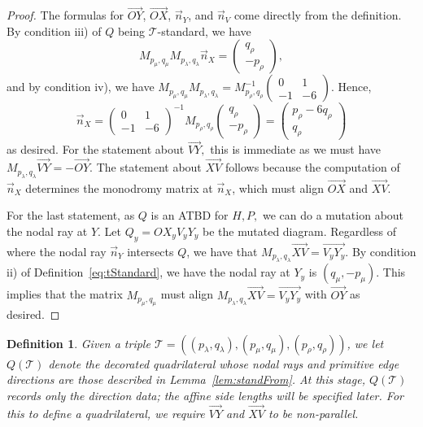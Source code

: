 \documentclass[11pt, reqno]{amsart}
\newtheorem{definition}[thm]{Definition}
\theoremstyle{remark}
\numberwithin{equation}{subsection}
\numberwithin{figure}{section}
\theoremstyle{customremark}
\newcommand{\Tt}{\mathcal{T}}
\newcommand{\vn}{{\vec{n}}}
\newcommand{\ovr}{\overrightarrow}
\newcommand{\la}{{\lambda}}
\begin{document}
\begin{proof}
    The formulas for $\ovr{OY}$, $\ovr{OX}$, $\vn_Y$, and $\vn_V$ come directly from the definition. By condition iii) of $Q$ being $\Tt$-standard, we have
    \[ M_{p_\mu,q_\mu}M_{p_\la,q_\la}\vn_X=\begin{pmatrix} q_\rho \\ -p_\rho\end{pmatrix},\]
    and by condition iv), we have $M_{p_\mu,q_\mu}M_{p_\la,q_\la}=M_{p_\rho,q_\rho}^{-1} \begin{pmatrix} 0 & 1 \\ -1 & -6 \end{pmatrix}.$
    Hence, 
    \[ \vn_X=\begin{pmatrix} 0 & 1 \\ -1 & -6 \end{pmatrix}^{-1}M_{p_\rho,q_\rho}\begin{pmatrix} q_\rho \\ -p_\rho\end{pmatrix}=\begin{pmatrix} p_\rho-6q_\rho \\ q_\rho \end{pmatrix} \]
    as desired. 
    For the statement about $\ovr{VY},$ this is immediate as we must have $M_{p_\la,q_\la}\ovr{VY}=-\ovr{OY}.$ The statement about $\ovr{XV}$ follows because the computation of $\vn_X$ determines the monodromy matrix at $\vn_X$, which must align $\ovr{OX}$ and $\ovr{XV}$.
    
    For the last statement, as $Q$ is an ATBD for $H,P,$ we can do a mutation about the nodal ray at $Y.$ Let $Q_y=OX_yV_yY_y$ be the mutated diagram. Regardless of where the nodal ray $\vn_Y$ intersects $Q$, we have that $M_{p_\la,q_\la}\ovr{XV}=\ovr{V_yY_y}.$ By condition ii) of Definition~\ref{eq:tStandard}, we have the nodal ray at $Y_y$ is $(q_\mu,-p_\mu).$ This implies that the matrix $M_{p_\mu,q_\mu}$ must align $M_{p_\la,q_\la}\ovr{XV}=\ovr{V_yY_y}$ with $\ovr{OY}$ as desired. 
  
\end{proof}

\begin{definition} \label{def:QTnoL}
Given a triple $\Tt=((p_\la,q_\la),(p_\mu,q_\mu),(p_\rho,q_\rho))$, we let $Q(\Tt)$ denote the decorated quadrilateral whose nodal rays and primitive edge directions are those described in Lemma~\ref{lem:standFrom}. At this stage, $Q(\Tt)$ records only the direction data; the affine side lengths will be specified later. For this to define a quadrilateral, we require $\ovr{VY}$ and $\ovr{XV}$ to be non-parallel.

\end{definition}
\end{document}
